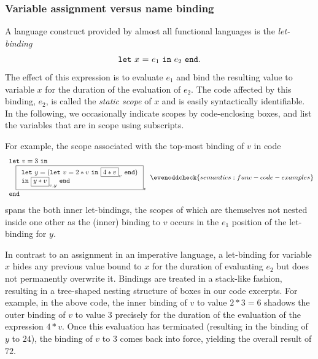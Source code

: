 \subsubsection{Variable assignment versus name binding}
\label{section:Part1:Semantics:Binding}
A language construct provided by almost all functional languages is
the \emph{let-binding} $$\mathtt{let}\ {x}\ \mathtt{=}\ {e_1}\ \mathtt{in}\ {e_2}\ \mathtt{end}.$$ The effect of this
expression is to evaluate $e_1$ and bind the resulting value to
variable $x$ for the duration of the evaluation of $e_2$.  The code
affected by this binding, $e_2$, is called the \emph{static scope} of
$x$ and is easily syntactically identifiable.  In the following, we
occasionally indicate scopes by code-enclosing boxes, and list the
variables that are in scope using subscripts.

For example, the scope associated with the top-most binding of $v$ in
code
\begin{equation}
\label{FunctionalCodeExample1}
\begin{array}{l}
\mathtt{let}\ v = 3\ \mathtt{in}\\
\quad 
  \fbox{$
   \begin{array}[t]{l} 
    \mathtt{let}\ y = (\mathtt{let}\ v=2*v \ \mathtt{in}\ \fbox{$4*v$}_v\ \mathtt{end})\\
    \mathtt{in}\ \fbox{$y*v$}_{v,y}\ \mathtt{end}\\
\end{array}$}_v\\
\mathtt{end}
\end{array}
  \evenoddcheck{semantics:func-code-examples}
\end{equation}
spans the both inner let-bindings, the scopes of which are themselves
not nested inside one other as the (inner) binding to $v$ occurs in
the $e_1$ position of the let-binding for $y$.

In contrast to an assignment in an imperative language, a let-binding
for variable $x$ hides any previous value bound to $x$ for the
duration of evaluating $e_2$ but does not permanently overwrite
it. Bindings are treated in a stack-like fashion, resulting in a
tree-shaped nesting structure of boxes in our code excerpts.
For example, in the above code, the inner binding of $v$ to value
$2*3=6$ shadows the outer binding of $v$ to value $3$ precisely for
the duration of the evaluation of the expression $4*v$. Once this
evaluation has terminated (resulting in the binding of $y$ to $24$),
the binding of $v$ to $3$ comes back into force, yielding the overall
result of $72$.

